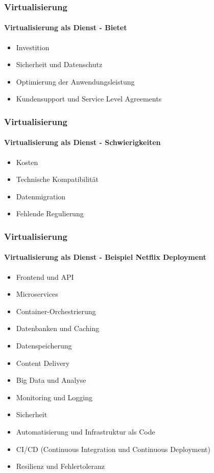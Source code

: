 \begin{frame}
  \frametitle{Virtualisierung}
  \framesubtitle{Virtualisierung als Dienst - Bietet}
  \begin{itemize}
    \item Investition
    \item Sicherheit und Datenschutz
    \item Optimierung der Anwendungsleistung
    \item Kundensupport und Service Level Agreements
  \end{itemize}
\end{frame}

\begin{frame}
  \frametitle{Virtualisierung}
  \framesubtitle{Virtualisierung als Dienst - Schwierigkeiten}
  \begin{itemize}
    \item Kosten
    \item Technische Kompatibilität
    \item Datenmigration
    \item Fehlende Regulierung
  \end{itemize}
\end{frame}

\begin{frame}
  \frametitle{Virtualisierung}
  \framesubtitle{Virtualisierung als Dienst - Beispiel Netflix Deployment}
  \begin{itemize}
    \item Frontend und API
    \item Microservices
    \item Container-Orchestrierung
    \item Datenbanken und Caching
    \item Datenspeicherung
    \item Content Delivery
    \item Big Data und Analyse
    \item Monitoring und Logging
    \item Sicherheit
    \item Automatisierung und Infrastruktur als Code
    \item CI/CD (Continuous Integration und Continuous Deployment)
    \item Resilienz und Fehlertoleranz
  \end{itemize}
\end{frame}

